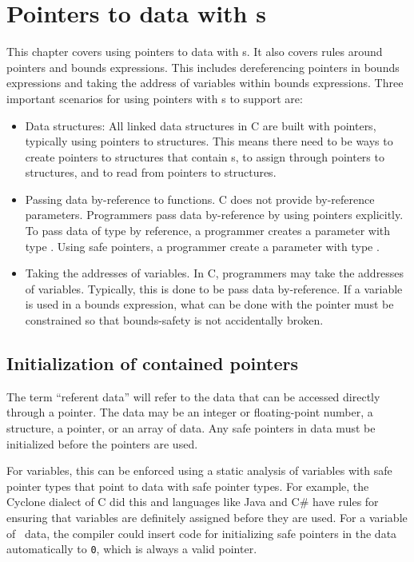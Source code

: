 
\chapter{Pointers  to data with \arrayptr s}
\label{chapter:pointers-to-data-with-arrayptrs}

This chapter covers using pointers to data with \arrayptr s.  It also covers rules
around pointers and bounds expressions.  This includes dereferencing pointers
in bounds expressions and taking the address of variables within bounds expressions.
Three important scenarios for using pointers with \arrayptr s to support are:
\begin{itemize}
\item Data structures: All linked data structures in 
C are built with pointers, typically using pointers to structures.   This means
there need to be ways to create pointers to structures that contain \arrayptr s,
to assign through pointers to structures, and to read from pointers to structures.
\item Passing data by-reference to functions.  C does not provide by-reference
parameters.  Programmers pass data by-reference by using pointers explicitly.
To pass data of type  by reference, a programmer creates a parameter
with type .  Using safe pointers, a programmer create a parameter
with type \ptrT.
\item Taking the addresses of variables.  In C, programmers may take the
addresses of variables.  Typically, this is done to be pass data by-reference.
If a variable is used in a bounds expression, what can be done with the pointer
must be constrained so that bounds-safety is not accidentally broken.
\end{itemize}

\section{Initialization of contained pointers}

The term ``referent data'' will refer to the data that can be accessed
directly through a pointer.  The data may be an integer or floating-point number, a structure,
a pointer, or an array of data.   Any safe pointers in data must be initialized
before the pointers are used.

For variables, this can be enforced using a static 
analysis of variables with safe pointer types that point to data with safe 
pointer types. For example, the Cyclone dialect of C \cite{Jim2002} did this
and languages like Java and C\# have rules for ensuring that variables
are definitely assigned before they are used.
For a variable of \arrayptr\ data, the compiler could insert code for 
initializing safe pointers in the data automatically to \texttt{0}, which is always
a valid pointer.    

